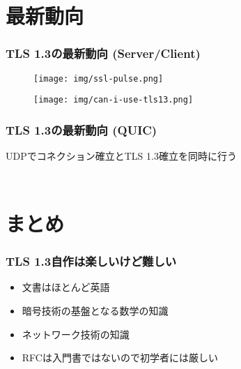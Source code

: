 \documentclass[dvipdfmx, 12pt]{beamer}
\begin{document}
\section{最新動向}
\begin{frame}
  \frametitle{TLS 1.3の最新動向 (Server/Client)}

  \begin{figure}
    \centering
    \texttt{[image: img/ssl-pulse.png]}
  \end{figure}

  \begin{figure}
    \centering
    \texttt{[image: img/can-i-use-tls13.png]}
  \end{figure}
\end{frame}

\begin{frame}
  \frametitle{TLS 1.3の最新動向 (QUIC)}

  \begin{center}
    UDPでコネクション確立とTLS 1.3確立を同時に行う
  \end{center}

  \begin{columns}
    \begin{column}{.5\textwidth}
      \begin{figure}
        \centering
        \scalebox{.9}{}
      \end{figure}
    \end{column}
    \begin{column}{.5\textwidth}
      \begin{figure}
        \centering
        \scalebox{.9}{}
      \end{figure}
    \end{column}
  \end{columns}
\end{frame}

\section{まとめ} %
\begin{frame}
  \frametitle{TLS 1.3自作は楽しいけど難しい}
  \begin{itemize}
    \item 文書はほとんど\alert{英語}
    \item 暗号技術の基盤となる\alert{数学}の知識
    \item \alert{ネットワーク}技術の知識
    \item \alert{RFC}は入門書ではないので初学者には厳しい
  \end{itemize}
\end{frame}
\end{document}
